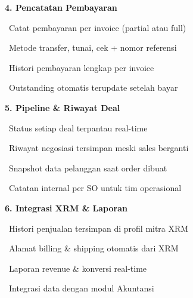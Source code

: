 \documentclass[a4paper]{article}
\begin{document}
\hfill%
\begin{minipage}[t]{0.485\textwidth}

    {\fontsize{10.5}{13}\selectfont\bfseries\color{IndigoPrimary} 4. Pencatatan Pembayaran}
    \vspace{3pt}

    {\fontsize{9}{13}\selectfont\color{TextDark}%
    \textbullet\ Catat pembayaran per invoice (partial atau full)\par\vspace{2pt}%
    \textbullet\ Metode transfer, tunai, cek + nomor referensi\par\vspace{2pt}%
    \textbullet\ Histori pembayaran lengkap per invoice\par\vspace{2pt}%
    \textbullet\ Outstanding otomatis terupdate setelah bayar}%
    \vspace{8pt}

    {\fontsize{10.5}{13}\selectfont\bfseries\color{IndigoPrimary} 5. Pipeline \& Riwayat Deal}
    \vspace{3pt}

    {\fontsize{9}{13}\selectfont\color{TextDark}%
    \textbullet\ Status setiap deal terpantau real-time\par\vspace{2pt}%
    \textbullet\ Riwayat negosiasi tersimpan meski sales berganti\par\vspace{2pt}%
    \textbullet\ Snapshot data pelanggan saat order dibuat\par\vspace{2pt}%
    \textbullet\ Catatan internal per SO untuk tim operasional}%
    \vspace{8pt}

    {\fontsize{10.5}{13}\selectfont\bfseries\color{IndigoPrimary} 6. Integrasi XRM \& Laporan}
    \vspace{3pt}

    {\fontsize{9}{13}\selectfont\color{TextDark}%
    \textbullet\ Histori penjualan tersimpan di profil mitra XRM\par\vspace{2pt}%
    \textbullet\ Alamat billing \& shipping otomatis dari XRM\par\vspace{2pt}%
    \textbullet\ Laporan revenue \& konversi real-time\par\vspace{2pt}%
    \textbullet\ Integrasi data dengan modul Akuntansi}%

\end{minipage}
\end{document}
